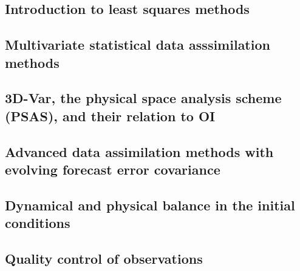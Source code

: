 \subsection{Introduction to least squares methods}
\label{sub:data_assimilation:squares}

\subsection{Multivariate statistical data asssimilation methods}
\label{sub:data_assimilation:multivar}

\subsection{3D-Var, the physical space analysis scheme (PSAS), and their relation to OI}
\label{sub:data_assimilation:3d-var}

\subsection{Advanced data assimilation methods with evolving forecast error covariance}
\label{sub:data_assimilation:advanced}

\subsection{Dynamical and physical balance in the initial conditions}
\label{sub:data_assimilation:balance}

\subsection{Quality control of observations}
\label{sub:data_assimilation:quality}




